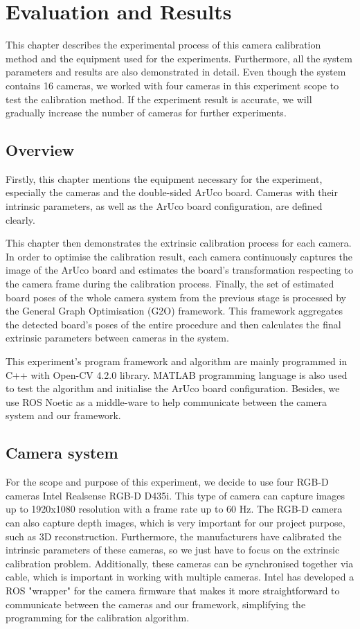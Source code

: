 \chapter{Evaluation and Results}
This chapter describes the experimental process of this camera calibration method and the equipment used for the experiments. Furthermore, all the system parameters and results are also demonstrated in detail. Even though the system contains 16 cameras, we worked with four cameras in this experiment scope to test the calibration method. If the experiment result is accurate, we will gradually increase the number of cameras for further experiments.

\clearpage
\section{Overview}
Firstly, this chapter mentions the equipment necessary for the experiment, especially the cameras and the double-sided ArUco board. Cameras with their intrinsic parameters, as well as the ArUco board configuration, are defined clearly. 

This chapter then demonstrates the extrinsic calibration process for each camera. In order to optimise the calibration result, each camera continuously captures the image of the ArUco board and estimates the board's transformation respecting to the camera frame during the calibration process.
Finally, the set of estimated board poses of the whole camera system from the previous stage is processed by the General Graph Optimisation (G2O) framework. This framework aggregates the detected board's poses of the entire procedure and then calculates the final extrinsic parameters between cameras in the system.

This experiment's program framework and algorithm are mainly programmed in C++ with Open-CV 4.2.0 library. MATLAB programming language is also used to test the algorithm and initialise the ArUco board configuration. Besides, we use ROS Noetic as a middle-ware to help communicate between the camera system and our framework.

\clearpage
\section{Camera system}
For the scope and purpose of this experiment, we decide to use four RGB-D cameras Intel Realsense RGB-D D435i. This type of camera can capture images up to 1920x1080 resolution with a frame rate up to 60 Hz. The RGB-D camera can also capture depth images, which is very important for our project purpose, such as 3D reconstruction. Furthermore, the manufacturers have calibrated the intrinsic parameters of these cameras, so we just have to focus on the extrinsic calibration problem. Additionally, these cameras can be synchronised together via cable, which is important in working with multiple cameras. Intel has developed a ROS "wrapper" for the camera firmware that makes it more straightforward to communicate between the cameras and our framework, simplifying the programming for the calibration algorithm.


